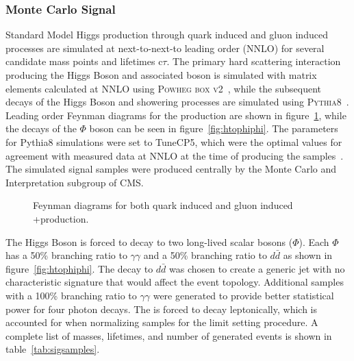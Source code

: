 \subsubsection{Monte Carlo Signal} \label{sec:ana_mcsig}
Standard Model Higgs production through quark induced and gluon induced \ZH processes are simulated at next-to-next-to leading order (NNLO) for several candidate mass points \mphi and lifetimes c$\tau$. The primary hard scattering interaction producing the Higgs Boson and associated \PZ boson is simulated with matrix elements calculated at NNLO using \textsc{Powheg box v2}~\cite{powheg}, while the subsequent decays of the Higgs Boson and showering processes are simulated using \textsc{Pythia8}~\cite{pythia8}. Leading order Feynman diagrams for the \ZH production are shown in figure~\ref{fig:ZH_feynman}, while the decays of the $\Phi$ boson can be seen in figure~\ref{fig:htophiphi}. The parameters for Pythia8 simulations were set to TuneCP5, which were the optimal values for agreement with measured data at NNLO at the time of producing the samples~\cite{tunecp5}. The simulated signal samples were produced centrally by the Monte Carlo and Interpretation subgroup of CMS.

\begin{figure}[htb!]
	\centering
	\begingroup
	\hfill
	
	\hfill
	
	\hfill
	
	\hfill
	\endgroup
	\caption[Feynman diagrams for both quark-induced and gluon-induced \PZns+\PH production.]{Feynman diagrams for both quark induced and gluon induced \PZns+\PH production.}
	\label{fig:ZH_feynman}
\end{figure}

The Higgs Boson is forced to decay to two long-lived scalar bosons ($\Phi$). Each $\Phi$ has a 50\% branching ratio to $\gamma\gamma$ and a 50\% branching ratio to $d\bar{d}$ as shown in figure~\ref{fig:htophiphi}. The decay to $d\bar{d}$ was chosen to create a generic jet with no characteristic signature that would affect the event topology. Additional samples with a 100\% branching ratio to $\gamma\gamma$ were generated to provide better statistical power for four photon decays. The \PZ is forced to decay leptonically, which is accounted for when normalizing samples for the limit setting procedure. A complete list of masses, lifetimes, and number of generated events is shown in table~\ref{tab:sigsamples}.

